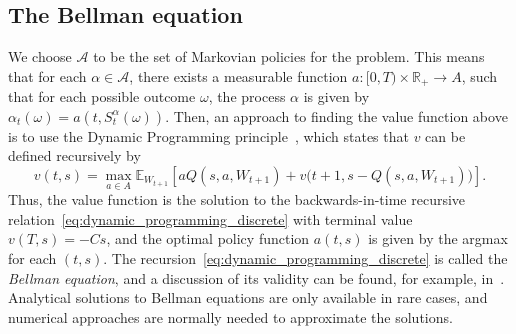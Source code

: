 \documentclass[main.tex]{subfiles}
\begin{document}
\subsection{The Bellman equation}\label{subsec:adp_bellman_equation}
We choose $\mathcal A$ to be the set of Markovian policies for the
problem. This means that for each $\alpha\in \mathcal
A$, there exists a
measurable function $a:[0,T)\times \mathbb R_+\to A$, such that for each possible outcome
$\omega$, the process $\alpha$ is given by
$\alpha_t(\omega) =
a(t,S_t^\alpha(\omega))$.
Then,
an approach to finding the value function above is to use the Dynamic
Programming principle~\citep{bertsekas2005dynamic}, which states that $v$ can be defined
recursively by
\begin{equation}\label{eq:dynamic_programming_discrete}
  v(t,s)=\max_{a\in A}\mathbb E_{W_{t+1}}\left[
    aQ(s,a,W_{t+1})
    +v\bigl(t+1,s-Q(s,a,W_{t+1})\bigr)\right].
\end{equation}
Thus, the value function is the solution to the backwards-in-time
recursive relation~\eqref{eq:dynamic_programming_discrete} with
terminal value $v(T,s)=-Cs$, and the optimal policy
function $a(t,s)$ is given by the argmax for each $(t,s)$.
The recursion~\eqref{eq:dynamic_programming_discrete} is called the
\emph{Bellman equation}, and a discussion
of its validity can be found, for example, in~\citet{bertsekas2005dynamic}.
Analytical solutions to Bellman equations are only available in
rare cases, and  numerical approaches are normally needed to
approximate the solutions.
\end{document}
